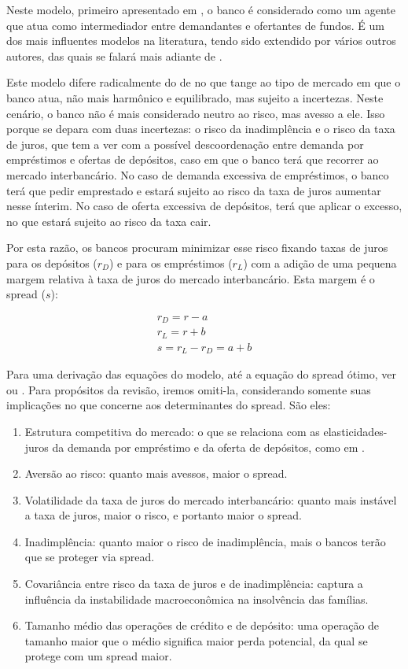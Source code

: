 \documentclass[a4paper, 12pt, openany, oneside, brazil]{abntex2}
\begin{document}
	Neste modelo, primeiro apresentado em , o banco é considerado como um agente que atua como intermediador entre demandantes e ofertantes de fundos. É um dos mais influentes modelos na literatura, tendo sido extendido por vários outros autores, das quais se falará mais adiante de .

	Este modelo difere radicalmente do de  no que tange ao tipo de mercado em que o banco atua, não mais harmônico e equilibrado, mas sujeito a incertezas. Neste cenário, o banco não é mais considerado neutro ao risco, mas avesso a ele. Isso porque se depara com duas incertezas: o risco da inadimplência e o risco da taxa de juros, que tem a ver com a possível descoordenação entre demanda por empréstimos e ofertas de depósitos, caso em que o banco terá que recorrer ao mercado interbancário. No caso de demanda excessiva de empréstimos, o banco terá que pedir emprestado e estará sujeito ao risco da taxa de juros aumentar nesse ínterim. No caso de oferta excessiva de depósitos, terá que aplicar o excesso, no que estará sujeito ao risco da taxa cair. 

	Por esta razão, os bancos procuram minimizar esse risco fixando taxas de juros para os depósitos ($r_D$) e para os empréstimos ($r_L$) com a adição de uma pequena margem relativa à taxa de juros do mercado interbancário. Esta margem é o spread ($s$):

	\begin{gather}
		r_D = r - a \\
		r_L = r + b \\
		s = r_L - r_D = a + b
	\end{gather}

	Para uma derivação das equações do modelo, até a equação do spread ótimo, ver  ou . Para propósitos da revisão, iremos omiti-la, considerando somente suas implicações no que concerne aos determinantes do spread. São eles:

	\begin{enumerate}
		\item Estrutura competitiva do mercado: o que se relaciona com as elasticidades-juros da demanda por empréstimo e da oferta de depósitos, como em .
		\item Aversão ao risco: quanto mais avessos, maior o spread.
		\item Volatilidade da taxa de juros do mercado interbancário: quanto mais instável a taxa de juros, maior o risco, e portanto maior o spread.
		\item Inadimplência: quanto maior o risco de inadimplência, mais o bancos terão que se proteger via spread.
		\item Covariância entre risco da taxa de juros e de inadimplência: captura a influência da instabilidade macroeconômica na insolvência das famílias. \cite{oreiro}
		\item Tamanho médio das operações de crédito e de depósito: uma operação de tamanho maior que o médio significa maior perda potencial, da qual se protege com um spread maior.
	\end{enumerate}
\end{document}
